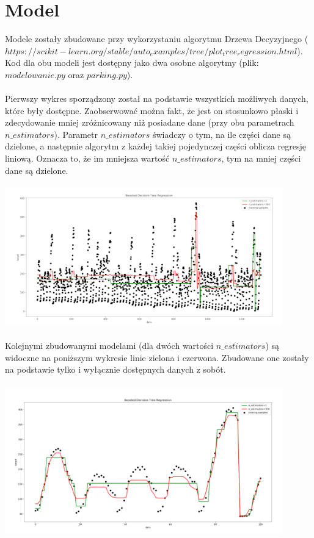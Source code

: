 \documentclass[]{article}
\begin{document}
\section{Model}
Modele zostały zbudowane przy wykorzystaniu algorytmu Drzewa Decyzyjnego ($https://scikit-learn.org/stable/auto_examples/tree/plot_tree_regression.html$). Kod dla obu modeli jest dostępny jako dwa osobne algorytmy (plik: $modelowanie.py$ oraz $parking.py$).\\
\\
Pierwszy wykres sporządzony został na podstawie wszystkich możliwych danych, które były dostępne. Zaobserwować można fakt, że jest on stosunkowo płaski i zdecydowanie mniej zróżnicowany niż posiadane dane (przy obu parametrach $n\_estimators$). Parametr $n\_estimators$ świadczy o tym, na ile części dane są dzielone, a następnie algorytm z każdej takiej pojedynczej części oblicza regresję liniową. Oznacza to, że im mniejsza wartość $n\_estimators$, tym na mniej części dane są dzielone.\\
\\
\includegraphics[width=12cm]{image-0}\\
\\
Kolejnymi zbudowanymi modelami (dla dwóch wartości $n\_estimators$) są widoczne na poniższym wykresie linie zielona i czerwona. Zbudowane one zostały na podstawie tylko i wyłącznie dostępnych danych z sobót. \\
\\
\includegraphics[width=12cm]{image-1}\\
\\
\end{document}
